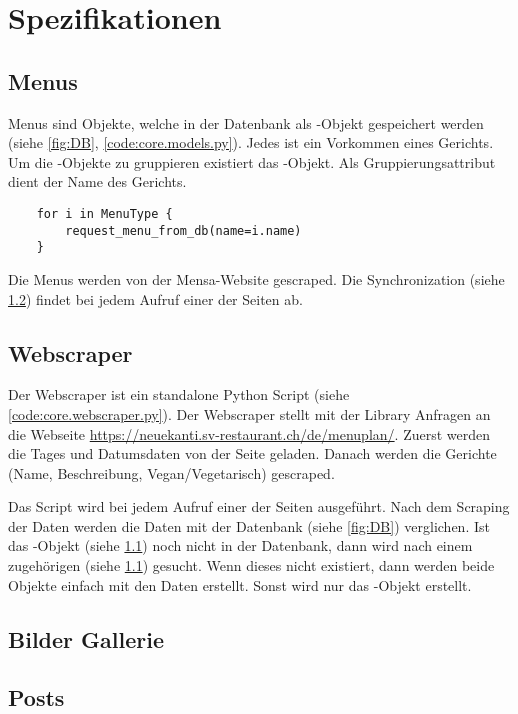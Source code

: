 \chapter{Spezifikationen}

\section{Menus} \label{spez:Menus}

Menus sind Objekte, welche in der Datenbank als -Objekt gespeichert
werden (siehe \ref{fig:DB}, \ref{code:core.models.py}). Jedes  ist
ein Vorkommen eines Gerichts. Um die -Objekte zu gruppieren existiert
das -Objekt. Als Gruppierungsattribut dient der Name des Gerichts.

\begin{lstlisting}
    for i in MenuType {
        request_menu_from_db(name=i.name)
    }
\end{lstlisting}

Die Menus werden von der Mensa-Website gescraped. Die Synchronization (siehe
\ref{spez:Webscraper}) findet bei jedem Aufruf einer der Seiten ab.

\section{Webscraper} \label{spez:Webscraper}

Der Webscraper ist ein standalone Python Script (siehe
\ref{code:core.webscraper.py}). Der Webscraper stellt mit der Library
 Anfragen an die Webseite
\url{https://neuekanti.sv-restaurant.ch/de/menuplan/}. Zuerst werden die Tages
und Datumsdaten von der Seite geladen. Danach werden die Gerichte (Name,
Beschreibung, Vegan/Vegetarisch) gescraped.

Das Script wird bei jedem Aufruf einer der Seiten ausgeführt. Nach dem Scraping
der Daten werden die Daten mit der Datenbank (siehe \ref{fig:DB}) verglichen.
Ist das -Objekt (siehe \ref{spez:Menus}) noch nicht in der Datenbank,
dann wird nach einem zugehörigen  (siehe \ref{spez:Menus})
gesucht. Wenn dieses nicht existiert, dann werden beide Objekte einfach mit den
Daten erstellt. Sonst wird nur das -Objekt erstellt.

\section{Bilder Gallerie} \label{spez:Gallerie}
\section{Posts} \label{spez:Posts}
